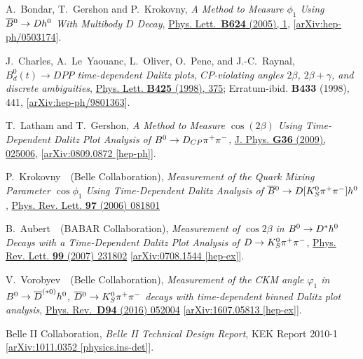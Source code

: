 \documentclass[a4paper,11pt]{article}
\begin{document}
\begin{thebibliography}{99}
A.~Bondar, T.~Gershon and P.~Krokovny, 
\textit{A Method to Measure $\phi_1$ Using $\overline{B}{}^0\to D h^0$ With Multibody $D$ Decay}, 
\href{https://doi.org/10.1016/j.physletb.2005.07.053}{Phys. Lett.~\textbf{B624} (2005), 1},
[\href{https://arxiv.org/abs/hep-ph/0503174}{arXiv:hep-ph/0503174}].

J.~Charles, A.~Le~Yaouanc, L.~Oliver, O.~Pene, and J.-C.~Raynal,
\textit{$B_d^0(t) \to DPP$ time-dependent Dalitz plots, $CP$-violating angles $2\beta$, $2\beta+\gamma$, and discrete ambiguities},
\href{https://doi.org/10.1016/S0370-2693(98)00250-0}{Phys. Lett. \textbf{B425} (1998), 375}; Erratum-ibid. \textbf{B433} (1998), 441,
[\href{https://arxiv.org/abs/hep-ph/9801363}{arXiv:hep-ph/9801363}].

T.~Latham and T.~Gershon,
\textit{A Method to Measure $\cos(2\beta)$ Using Time-Dependent Dalitz Plot Analysis of $B^0\to D_{CP}\pi^+\pi^-$},
\href{https://doi.org/10.1088/0954-3899/36/2/025006}{J. Phys. \textbf{G36} (2009), 025006},
[\href{https://arxiv.org/abs/0809.0872}{arXiv:0809.0872 [hep-ph]}].

P.~Krokovny~\etal~(Belle Collaboration),
\textit{Measurement of the Quark Mixing Parameter $\cos\phi_1$ Using Time-Dependent Dalitz Analysis of $\overline{B}{}^0\to D[K_S^0\pi^+\pi^-]h^0$},
\href{https://doi.org/10.1103/PhysRevLett.97.081801}{Phys. Rev. Lett. \textbf{97} (2006) 081801}

B.~Aubert~\etal~(BABAR Collaboration),
\textit{Measurement of $\cos{2\beta}$ in $B^0\to D^{*}h^0$ Decays with
a Time-Dependent Dalitz Plot Analysis of $D\to K_S^0\pi^+\pi^-$}, 
\href{https://doi.org/10.1103/PhysRevLett.99.231802}{Phys. Rev. Lett. \textbf{99} (2007) 231802} 
[\href{https://arxiv.org/abs/0708.1544}{arXiv:0708.1544 [hep-ex]}].

V.~Vorobyev~\etal~(Belle Collaboration),
\textit{Measurement of the CKM angle $\varphi_1$ in $B^0\to \overline{D}^{(*0)}h^0$,
$\overline{D}{}^0\to K_S^0\pi^+\pi^-$ decays with time-dependent binned Dalitz plot analysis}, 
\href{https://doi.org/10.1103/PhysRevD.94.052004}{Phys. Rev.~\textbf{D94} (2016) 052004} 
[\href{https://arxiv.org/abs/1607.05813}{arXiv:1607.05813 [hep-ex]}].



Belle II Collaboration, 
\textit{Belle II Technical Design Report},
KEK Report 2010-1 
[\href{https://arxiv.org/abs/1011.0352}{arXiv:1011.0352 [physics.ins-det]}].


\end{thebibliography}
\end{document}
